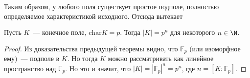 Таким образом, у любого поля существует простое подполе, полностью определяемое характеристикой исходного.
Отсюда вытекает

\follow Пусть $K$~--- конечное поле, $\text{char} K = p$. Тогда $|K|=p^n$ для некоторого $n\in\N$.
\begin{proof}
    Из доказательства предыдущей теоремы видно, что $\mathbb{F}_p$ (или изоморфное ему)~--- подполе в $K$.
    Но тогда $K$ можно рассматривать как линейное пространство над $\mathbb{F}_p$.
    Но это и значит, что $|K|=|\mathbb{F}_p|^n=p^n$, где $n = [K:\mathbb{F}_p]$.
\end{proof}